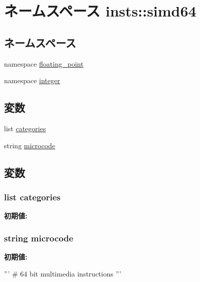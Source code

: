 \hypertarget{namespaceinsts_1_1simd64}{
\section{ネームスペース insts::simd64}
\label{namespaceinsts_1_1simd64}
}
\subsection*{ネームスペース}
\begin{DoxyCompactItemize}
\item 
namespace \hyperlink{namespaceinsts_1_1simd64_1_1floating__point}{floating\_\-point}
\item 
namespace \hyperlink{namespaceinsts_1_1simd64_1_1integer}{integer}
\end{DoxyCompactItemize}
\subsection*{変数}
\begin{DoxyCompactItemize}
\item 
list \hyperlink{namespaceinsts_1_1simd64_a273cf0f1630af14c1582f05e53354a55}{categories}
\item 
string \hyperlink{namespaceinsts_1_1simd64_a770f11a173e99389a8802f0107ed8f52}{microcode}
\end{DoxyCompactItemize}


\subsection{変数}
\hypertarget{namespaceinsts_1_1simd64_a273cf0f1630af14c1582f05e53354a55}{
\subsubsection[{categories}]{\setlength{\rightskip}{0pt plus 5cm}list {\bf categories}}}
\label{namespaceinsts_1_1simd64_a273cf0f1630af14c1582f05e53354a55}
{\bfseries 初期値:}
\begin{DoxyCode}
\end{DoxyCode}
\hypertarget{namespaceinsts_1_1simd64_a770f11a173e99389a8802f0107ed8f52}{
\subsubsection[{microcode}]{\setlength{\rightskip}{0pt plus 5cm}string {\bf microcode}}}
\label{namespaceinsts_1_1simd64_a770f11a173e99389a8802f0107ed8f52}
{\bfseries 初期値:}
\begin{DoxyCode}
'''
# 64 bit multimedia instructions
'''
\end{DoxyCode}
